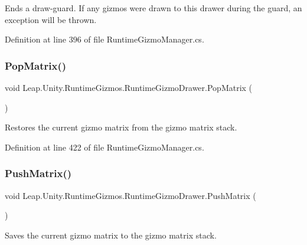 Ends a draw-\/guard. If any gizmos were drawn to this drawer during the guard, an exception will be thrown. 



Definition at line 396 of file Runtime\+Gizmo\+Manager.\+cs.

\mbox{\label{class_leap_1_1_unity_1_1_runtime_gizmos_1_1_runtime_gizmo_drawer_a6a0c428dd1c24aa043eabc5f4869d48e}} 
\subsubsection{\texorpdfstring{PopMatrix()}{PopMatrix()}}
{\footnotesize\ttfamily void Leap.\+Unity.\+Runtime\+Gizmos.\+Runtime\+Gizmo\+Drawer.\+Pop\+Matrix (\begin{DoxyParamCaption}{ }\end{DoxyParamCaption})}



Restores the current gizmo matrix from the gizmo matrix stack. 



Definition at line 422 of file Runtime\+Gizmo\+Manager.\+cs.

\mbox{\label{class_leap_1_1_unity_1_1_runtime_gizmos_1_1_runtime_gizmo_drawer_a38f0b9ad5162a609201eff87a19e205e}} 
\subsubsection{\texorpdfstring{PushMatrix()}{PushMatrix()}}
{\footnotesize\ttfamily void Leap.\+Unity.\+Runtime\+Gizmos.\+Runtime\+Gizmo\+Drawer.\+Push\+Matrix (\begin{DoxyParamCaption}{ }\end{DoxyParamCaption})}



Saves the current gizmo matrix to the gizmo matrix stack. 



